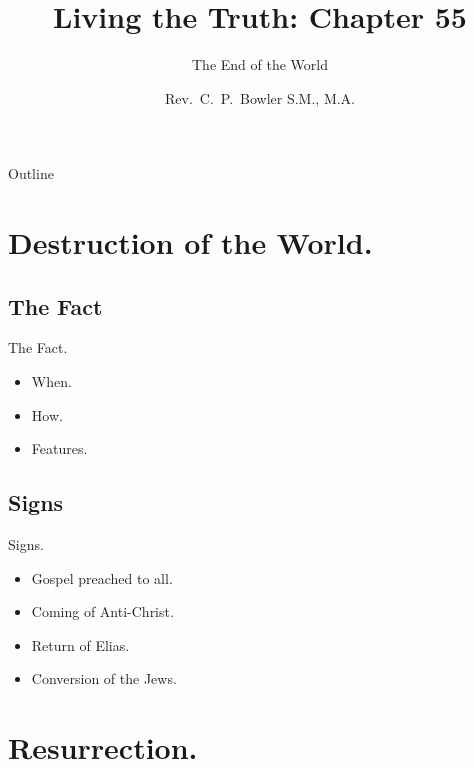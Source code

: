 \documentclass{beamer}
\title[Living the Truth 55] %
{Living the Truth: Chapter 55}
\subtitle
{The End of the World} %
\author{Rev.~C.~P.~Bowler S.M., M.A.}
\begin{document}
\begin{frame}
  \titlepage
\end{frame}

\begin{frame}{Outline}
  \tableofcontents
\end{frame}





\section{Destruction of the World.}

\subsection{The Fact}

\begin{frame}{The Fact.}
\begin{itemize}
\item When.
\item How.
\item Features.
\end{itemize}
\end{frame}
\subsection{Signs}

\begin{frame}{Signs.}
\begin{itemize}
\item Gospel preached to all.
\item Coming of Anti-Christ.
\item Return of Elias.
\item Conversion of the Jews.
\end{itemize}
\end{frame}

\section{Resurrection.}
\end{document}
